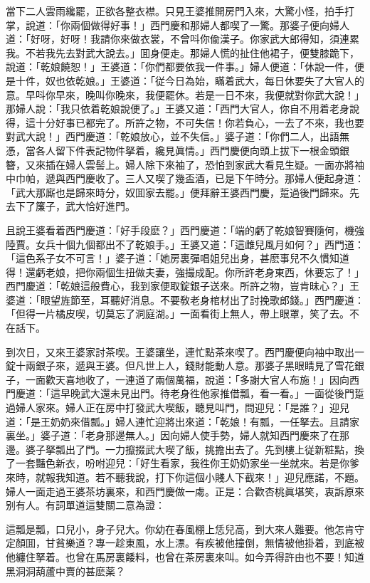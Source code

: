當下二人雲雨纔罷，正欲各整衣襟。只見王婆推開房門入來，大驚小怪，拍手打掌，說道：「你兩個做得好事！」西門慶和那婦人都喫了一驚。那婆子便向婦人道：「好呀，好呀！我請你來做衣裳，不曾呌你偸漢子。你家武大郎得知，須連累我。不若我先去對武大說去。」囬身便走。那婦人慌的扯住他裙子，便雙膝跪下，說道：「乾娘饒恕！」王婆道：「你們都要依我一件事。」婦人便道：「休說一件，便是十件，奴也依乾娘。」王婆道：「従今日為始，瞞着武大，每日休要失了大官人的意。早呌你早來，晚叫你晚來，我便罷休。若是一日不來，我便就對你武大說！」那婦人說：「我只依着乾娘說便了。」王婆又道：「西門大官人，你自不用着老身說得，這十分好事已都完了。所許之物，不可失信！你若負心，一去了不來，我也要對武大說！」西門慶道：「乾娘放心，並不失信。」婆子道：「你們二人，出語無憑，當各人留下件表記物件拏着，纔見眞情。」西門慶便向頭上拔下一根金頭銀簪，又來插在婦人雲髻上。婦人除下來袖了，恐怕到家武大看見生疑。一面亦將袖中巾帕，遞與西門慶收了。三人又喫了幾盃酒，已是下午時分。那婦人便起身道：「武大那廝也是歸來時分，奴囬家去罷。」便拜辭王婆西門慶，踅過後門歸來。先去下了簾子，武大恰好進門。

且說王婆看着西門慶道：「好手段麽？」西門慶道：「端的虧了乾娘智賽隨何，機強陸賈。女兵十個九個都出不了乾娘手。」王婆又道：「這雌兒風月如何？」西門道：「這色系子女不可言！」婆子道：「她房裏彈唱姐兒出身，甚麽事兒不久慣知道得！還虧老娘，把你兩個生扭做夫妻，強撮成配。你所許老身東西，休要忘了！」西門慶道：「乾娘這般費心，我到家便取錠銀子送來。所許之物，豈肯昧心？」王婆道：「眼望旌節至，耳聽好消息。不要敎老身棺材出了討挽歌郎錢。」西門慶道：「但得一片橘皮喫，切莫忘了洞庭湖。」一面看街上無人，帶上眼罩，笑了去。不在話下。

到次日，又來王婆家討茶喫。王婆讓坐，連忙點茶來喫了。西門慶便向袖中取出一錠十兩銀子來，遞與王婆。但凡世上人，錢財能動人意。那婆子黑眼睛見了雪花銀子，一面歡天喜地收了，一連道了兩個萬福，說道：「多謝大官人布施！」因向西門慶道：「這早晚武大還未見出門。待老身徃他家推借瓢，看一看。」一面從後門踅過婦人家來。婦人正在房中打發武大喫飯，聽見叫門，問迎兒：「是誰？」迎兒道：「是王奶奶來借瓢。」婦人連忙迎將出來道：「乾娘！有瓢，一任拏去。且請家裏坐。」婆子道：「老身那邊無人。」因向婦人使手勢，婦人就知西門慶來了在那邊。婆子拏瓢出了門。一力攛掇武大喫了飯，挑擔出去了。先到樓上従新粧點，換了一套豔色新衣，吩咐迎兒：「好生看家，我徃你王奶奶家坐一坐就來。若是你爹來時，就報我知道。若不聽我說，打下你這個小賤人下截來！」迎兒應諾，不題。婦人一面走過王婆茶坊裏來，和西門慶做一䖏。正是：合歡杏桃眞堪笑，衷訴原來别有人。有詞單道這雙關二意為證：

\begin{myquote}
這瓢是瓢，口兒小，身子兒大。你幼在春風棚上恁兒高，到大來人難要。他怎肯守定顏囬，甘貧樂道？專一趁東風，水上漂。有疾被他撞倒，無情被他掛着，到底被他纏住拏着。也曾在馬房裏餧料，也曾在茶房裏來叫。如今弄得許由也不要！知道黑洞洞葫蘆中賣的甚麽薬？
\end{myquote}


